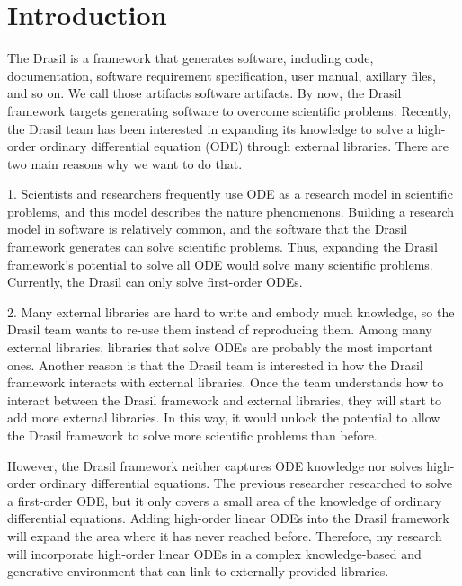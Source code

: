 \chapter{Introduction}
The Drasil is a framework that generates software, including code, documentation, software requirement specification, user manual, axillary files, and so on. We call those artifacts software artifacts. By now, the Drasil framework targets generating software to overcome scientific problems. Recently, the Drasil team has been interested in expanding its knowledge to solve a high-order ordinary differential equation (ODE) through external libraries. There are two main reasons why we want to do that.

1. Scientists and researchers frequently use ODE as a research model in scientific problems, and this model describes the nature phenomenons. Building a research model in software is relatively common, and the software that the Drasil framework generates can solve scientific problems. Thus, expanding the Drasil framework's potential to solve all ODE would solve many scientific problems. Currently, the Drasil can only solve first-order ODEs.

2. Many external libraries are hard to write and embody much knowledge, so the Drasil team wants to re-use them instead of reproducing them. Among many external libraries, libraries that solve ODEs are probably the most important ones. Another reason is that the Drasil team is interested in how the Drasil framework interacts with external libraries. Once the team understands how to interact between the Drasil framework and external libraries, they will start to add more external libraries. In this way, it would unlock the potential to allow the Drasil framework to solve more scientific problems than before. 

However, the Drasil framework neither captures ODE knowledge nor solves high-order ordinary differential equations. The previous researcher researched to solve a first-order ODE, but it only covers a small area of the knowledge of ordinary differential equations. Adding high-order linear ODEs into the Drasil framework will expand the area where it has never reached before. Therefore, my research will incorporate high-order linear ODEs in a complex knowledge-based and generative environment that can link to externally provided libraries.

